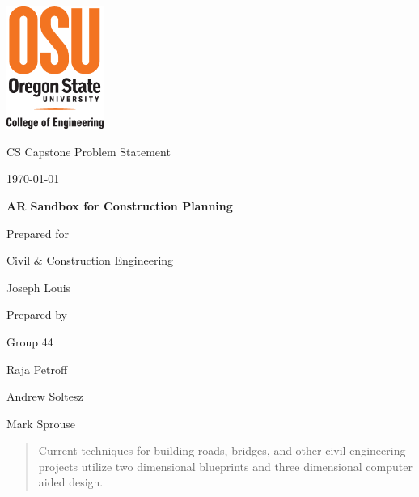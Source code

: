 \documentclass[onecolumn, draftclsnofoot,10pt, compsoc]{IEEEtran}
\def \CapstoneTeamName{		The Cleverly Named Team}
\def \CapstoneTeamNumber{		44}
\def \GroupMemberOne{			Raja Petroff}
\def \GroupMemberTwo{			Andrew Soltesz}
\def \GroupMemberThree{			Mark Sprouse}
\def \CapstoneProjectName{		AR Sandbox for Construction Planning}
\def \CapstoneSponsorCompany{	Civil \& Construction Engineering}
\def \CapstoneSponsorPerson{		Joseph Louis}
\def \DocType{		Problem Statement
				}
\newcommand{\NameSigPair}[1]{\par
\makebox[2.75in][r]{#1} \hfil 	\makebox[3.25in]{\makebox[2.25in]{\hrulefill} \hfill		\makebox[.75in]{\hrulefill}}
\par\vspace{-12pt} \textit{\tiny\noindent
\makebox[2.75in]{} \hfil		\makebox[3.25in]{\makebox[2.25in][r]{Signature} \hfill	\makebox[.75in][r]{Date}}}}
\renewcommand{\NameSigPair}[1]{#1}
\begin{document}
\begin{titlepage}
    \begin{singlespace}
    	\includegraphics[height=4cm]{coe_v_spot1}
        \hfill 
        \par\vspace{.2in}
        \centering
        \scshape{
            \huge CS Capstone \DocType \par
            {\large\today}\par
            \vspace{.5in}
            \textbf{\Huge\CapstoneProjectName}\par
            \vfill
            {\large Prepared for}\par
            \Huge \CapstoneSponsorCompany\par
            \vspace{5pt}
            {\Large\NameSigPair{\CapstoneSponsorPerson}\par}
            {\large Prepared by }\par
            Group\CapstoneTeamNumber\par
            \vspace{5pt}
            {\Large
                \NameSigPair{\GroupMemberOne}\par
                \NameSigPair{\GroupMemberTwo}\par
                \NameSigPair{\GroupMemberThree}\par
            }
            \vspace{20pt}
        }
        \begin{abstract}
        	Current techniques for building roads, bridges, and other civil engineering projects utilize two dimensional blueprints and three dimensional computer aided design.

\end{abstract}
\end{singlespace}
\end{titlepage}
\end{document}
